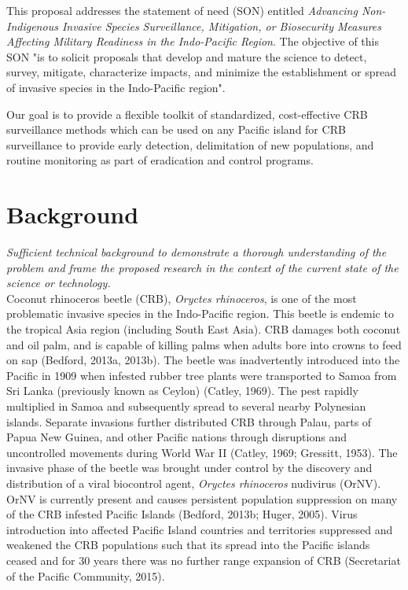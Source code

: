 \documentclass[11pt,english,letterpaper]{scrartcl}
\begin{document}
This proposal addresses the statement of need (SON) entitled \textit{Advancing Non-Indigenous Invasive Species Surveillance, Mitigation, or Biosecurity Measures Affecting Military Readiness in the Indo-Pacific Region}. The objective of this SON "is to solicit proposals that develop and mature the science to detect, survey, mitigate, characterize impacts, and minimize the establishment or spread of invasive species in the Indo-Pacific region".
	
Our goal is to provide a flexible toolkit of standardized, cost-effective CRB surveillance methods which can be used on any Pacific island for CRB surveillance to provide early detection, delimitation of new populations, and routine monitoring as part of eradication and control programs.

\section{Background}

\textit{Sufficient technical background to demonstrate a thorough understanding of the problem and frame the proposed research in the context of the current state of the science or technology.}\\

Coconut rhinoceros beetle (CRB), \textit{Oryctes rhinoceros}, is one of the most problematic invasive species in the Indo-Pacific region. This beetle is endemic to the tropical Asia region (including South East Asia). CRB damages both coconut and oil palm, and is capable of killing palms when adults bore into crowns to feed on sap \cite{Bedford2013} (Bedford, 2013a, 2013b). The beetle was inadvertently introduced into the Pacific in 1909 when infested rubber tree plants were transported to Samoa from Sri Lanka (previously known as Ceylon) (Catley, 1969). The pest rapidly multiplied in Samoa and subsequently spread to several nearby Polynesian islands. Separate invasions further distributed CRB through Palau, parts of Papua New Guinea, and other Pacific nations through disruptions and uncontrolled movements during World War II (Catley, 1969; Gressitt, 1953). The invasive phase of the beetle was brought under control by the discovery and distribution of a viral biocontrol agent, \textit{Oryctes rhinoceros} nudivirus (OrNV). OrNV is currently present and causes persistent population suppression on many of the CRB infested Pacific Islands (Bedford, 2013b; Huger, 2005). Virus introduction into affected Pacific Island countries and territories suppressed and weakened the CRB populations such that its spread into the Pacific islands ceased and for 30 years there was no further range expansion of CRB (Secretariat of the Pacific Community, 2015). 
\end{document}
